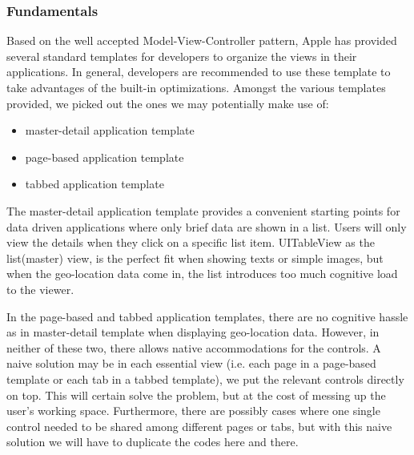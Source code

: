 \documentclass[12pt,a4paper]{article}
\renewcommand\texttt[1]{{\ttfamily\color{textttColor}#1}}
\begin{document}
            \subsubsection{Fundamentals} %
            \label{fe:fundamentals}
            Based on the well accepted Model-View-Controller pattern, Apple has provided several standard templates for developers to organize the views in their applications. In general, developers are recommended to use these template to take advantages of the built-in optimizations. Amongst the various templates provided, we picked out the ones we may potentially make use of:
            \begin{itemize}
            \setlength\itemsep{-0.5em}
            \item master-detail application template
            \item page-based application template
            \item tabbed application template
            \end{itemize}
            
            The master-detail application template provides a convenient starting points for data driven applications where only brief data are shown in a list. Users will only view the details when they click on a specific list item. \texttt{UITableView} as the list(master) view, is the perfect fit when showing texts or simple images, but when the geo-location data come in, the list introduces too much cognitive load to the viewer. 
            
            In the page-based and tabbed application templates, there are no cognitive hassle as in master-detail template when displaying geo-location data. However, in neither of these two, there allows native accommodations for the controls. A naive solution may be in each essential view (i.e. each page in a page-based template or each tab in a tabbed template), we put the relevant controls directly on top. This will certain solve the problem, but at the cost of messing up the user's working space. Furthermore, there are possibly cases where one single control needed to be shared among different pages or tabs, but with this naive solution we will have to duplicate the codes here and there.
            
\end{document}
